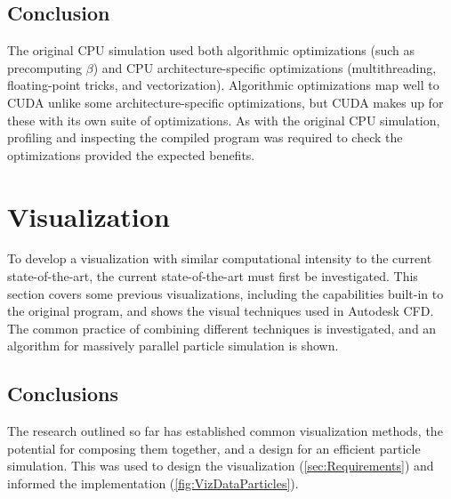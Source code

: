 



\subsection{Conclusion}
The original CPU simulation used both algorithmic optimizations (such as precomputing $\beta$) and CPU architecture-specific optimizations (multithreading, floating-point tricks, and vectorization).
Algorithmic optimizations map well to CUDA unlike some architecture-specific optimizations, but CUDA makes up for these with its own suite of optimizations.
As with the original CPU simulation, profiling and inspecting the compiled program was required to check the optimizations provided the expected benefits.

\pagebreak
\section{Visualization}\label{sec:Research:Visualization}
To develop a visualization with similar computational intensity to the current state-of-the-art, the current state-of-the-art must first be investigated.
This section covers some previous visualizations, including the capabilities built-in to the original program, and shows the visual techniques used in Autodesk CFD.
The common practice of combining different techniques is investigated, and an algorithm for massively parallel particle simulation is shown.








\subsection{Conclusions}
The research outlined so far has established common visualization methods, the potential for composing them together, and a design for an efficient particle simulation.
This was used to design the visualization (\cref{sec:Requirements}) and informed the implementation (\cref{fig:VizDataParticles}).